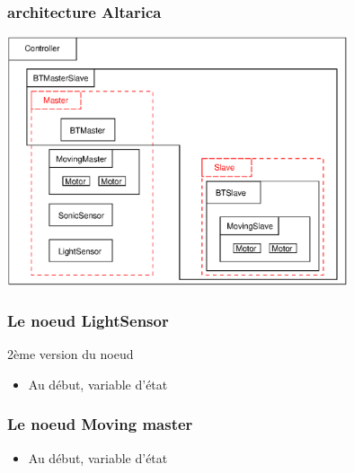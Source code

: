  \begin{frame}
  \frametitle{architecture Altarica}
  \center
  \includegraphics[width=10cm]{ARmodel.eps}

 \end{frame}
 
 
 \begin{frame}
  \frametitle{Le noeud LightSensor}

    \begin{block}{2ème version du noeud}
    
    \end{block}
    
    \begin{block}
    \begin{itemize}
      \item Au début, variable d'état
   \end{itemize}
  \end{block}

 \end{frame}
 
  \begin{frame}
  \frametitle{Le noeud Moving master}

    \begin{block}
    
    \end{block}
    
    \begin{block}
    \begin{itemize}
      \item Au début, variable d'état
   \end{itemize}
  \end{block}

 \end{frame}

